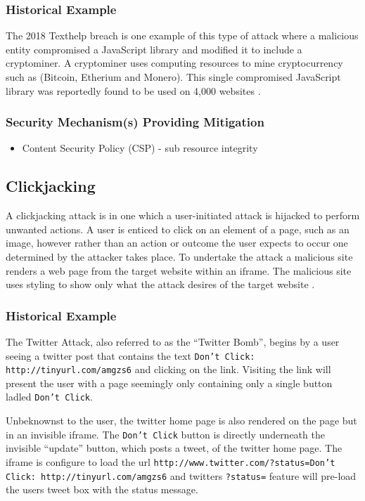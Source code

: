 \documentclass{mscreport}
\begin{document}
\subsubsection{Historical Example}
The 2018 Texthelp breach is one example of this type of attack where a malicious entity compromised a JavaScript library and modified it to include a cryptominer. A cryptominer uses computing resources to mine cryptocurrency such as (Bitcoin, Etherium and Monero). This single compromised JavaScript library was reportedly found to be used on 4,000 websites \cite{Billman2018-sq}.

\subsubsection{Security Mechanism(s) Providing Mitigation}

\begin{itemize}
	\setlength\itemsep{0.1em}
	\item Content Security Policy (CSP) - sub resource integrity
\end{itemize}

\subsection{Clickjacking}

A clickjacking attack is in one which a user-initiated attack is hijacked to perform unwanted actions. A user is enticed to click on an element of a page, such as an image, however rather than an action or outcome the user expects to occur one determined by the attacker takes place. To undertake the attack a malicious site renders a web page from the target website within an iframe. The malicious site uses styling to show only what the attack desires of the target website \cite{Jamwal2018-tz}.

\subsubsection{Historical Example}
The Twitter Attack, also referred to as the ``Twitter Bomb'', begins by a user seeing a twitter post that contains the text \texttt{Don't Click: http://tinyurl.com/amgzs6} \cite{Jani2015-kw} and clicking on the link. Visiting the link will present the user with a page seemingly only containing only a single button ladled \texttt{Don't Click}.

\vspace{0.3cm} \noindent
Unbeknownst to the user, the twitter home page is also rendered on the page but in an invisible iframe. The \texttt{Don't Click} button is directly underneath the invisible “update” button, which posts a tweet, of the twitter home page. The iframe is configure to load the url \texttt{http://www.twitter.com/?status=Don't Click: http://tinyurl.com/amgzs6} \cite{Jani2015-kw} and twitters \texttt{?status=} feature will pre-load the users tweet box with the status message.
\end{document}
